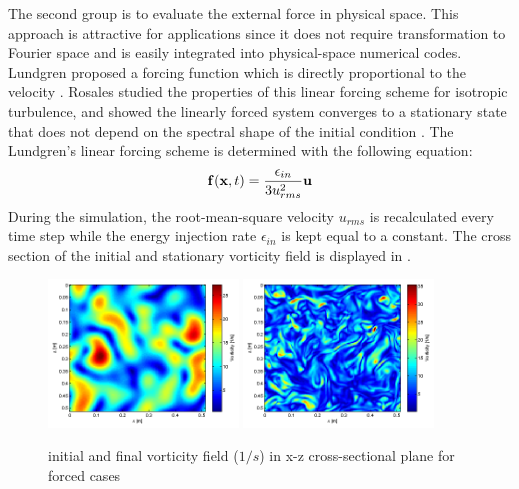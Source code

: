 The second group is to evaluate the external force in physical space. This approach is attractive for applications since it does not require transformation to Fourier space and is easily integrated into physical-space numerical codes. Lundgren proposed a forcing function which is directly proportional to the velocity \cite{Lundgren2003Linearly}. Rosales studied the properties of this linear forcing scheme for isotropic turbulence, and showed the linearly forced system converges to a stationary state that does not depend on the spectral shape of the initial condition \cite{Rosales2005Linear}. The Lundgren's linear forcing scheme is determined with the following equation:
\begin{equation}
\mathbf{f}(\mathbf{x}, t) = \frac{\epsilon_{in}}{3u_{rms}^2}\mathbf{u}
\end{equation}
During the simulation, the root-mean-square velocity $u_{rms}$ is recalculated every time step while the energy injection rate $\epsilon_{in}$ is kept equal to a constant.
The cross section of the initial and stationary vorticity field is displayed in .

\begin{figure}[!htbp]\centering
\includegraphics[width=0.45\textwidth]{Figures/vortex-0}
\includegraphics[width=0.45\textwidth]{Figures/vortex-1}

\caption{initial and final vorticity field ($1/s$) in x-z cross-sectional
plane for forced cases\label{fig:vort}}
\end{figure}

